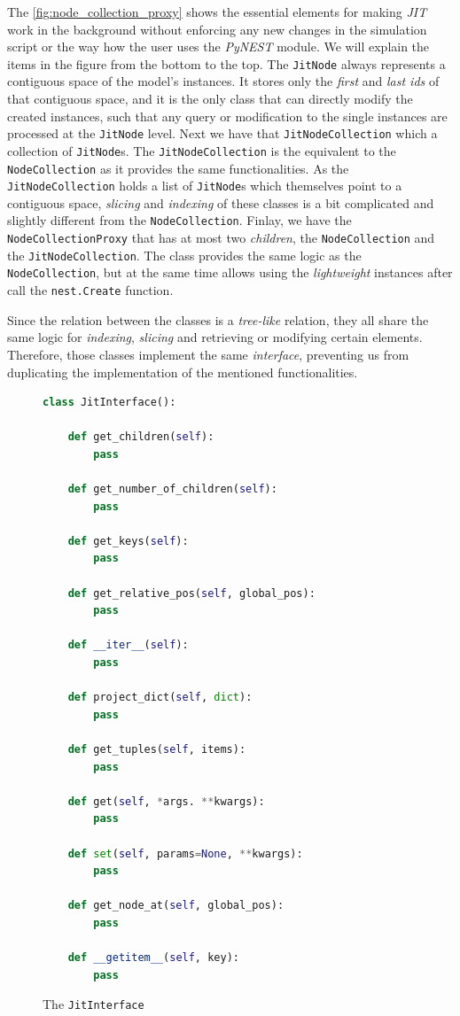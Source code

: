 The \autoref{fig:node_collection_proxy} shows the essential elements for making \emph{JIT} work in the background without enforcing any new changes in the simulation script or the way how the user uses the \emph{PyNEST} module. We will explain the items in the figure from the bottom to the top. The \texttt{JitNode} always represents a contiguous space of the model's instances. It stores only the \emph{first} and \emph{last ids} of that contiguous space, and it is the only class that can directly modify the created instances, such that any query or modification to the single instances are processed at the \texttt{JitNode} level. Next we have that \texttt{JitNodeCollection} which a collection of \texttt{JitNode}s. The \texttt{JitNodeCollection} is the equivalent to the \texttt{NodeCollection} as it provides the same functionalities. As the \texttt{JitNodeCollection} holds a list of \texttt{JitNode}s which themselves point to a contiguous space, \emph{slicing} and \emph{indexing} of these classes is a bit complicated and slightly different from the \texttt{NodeCollection}. Finlay, we have the \texttt{NodeCollectionProxy} that has at most two \emph{children}, the \texttt{NodeCollection} and the \texttt{JitNodeCollection}. The class provides the same logic as the \texttt{NodeCollection}, but at the same time allows using the \emph{lightweight} instances after call the \texttt{nest.Create} function.

Since the relation between the classes is a  \emph{tree-like} relation, they all share the same logic for \emph{indexing}, \emph{slicing} and retrieving or modifying certain elements. Therefore, those classes implement the same \emph{interface}, preventing us from duplicating the implementation of the mentioned functionalities. 




\begin{figure}[ht!]
\centering
\begin{lstlisting}[language=Python]
class JitInterface():

    def get_children(self):
        pass
        
    def get_number_of_children(self):
        pass
    
    def get_keys(self):
        pass
    
    def get_relative_pos(self, global_pos):
        pass
        
    def __iter__(self):
        pass
        
    def project_dict(self, dict):
        pass
    
    def get_tuples(self, items):
        pass
        
    def get(self, *args. **kwargs):
        pass
        
    def set(self, params=None, **kwargs):
        pass
    
    def get_node_at(self, global_pos):
        pass
        
    def __getitem__(self, key):
        pass
\end{lstlisting}
\caption{The \texttt{JitInterface}}
\label{fig:jit_interface}
\end{figure}



